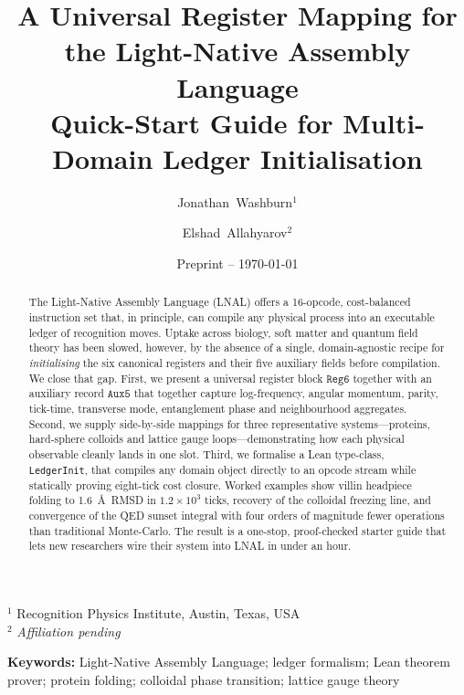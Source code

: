 \documentclass[11pt,a4paper]{article}
\title{A Universal Register Mapping for the Light-Native Assembly Language\\Quick-Start Guide for Multi-Domain Ledger Initialisation}
\author{Jonathan~Washburn$^{1}$ \and Elshad~Allahyarov$^{2}$}
\date{Preprint -- \today}
\begin{document}
\maketitle

\begin{center}
$^{1}$ Recognition Physics Institute, Austin, Texas, USA\\
$^{2}$ \textit{Affiliation pending}
\end{center}

\begin{abstract}
The Light-Native Assembly Language (LNAL) offers a 16-opcode, cost-balanced instruction set that, in principle, can compile any physical process into an executable ledger of recognition moves.  Uptake across biology, soft matter and quantum field theory has been slowed, however, by the absence of a single, domain-agnostic recipe for \emph{initialising} the six canonical registers and their five auxiliary fields before compilation.  We close that gap.  First, we present a universal register block $\texttt{Reg6}$ together with an auxiliary record $\texttt{Aux5}$ that together capture log-frequency, angular momentum, parity, tick-time, transverse mode, entanglement phase and neighbourhood aggregates.  Second, we supply side-by-side mappings for three representative systems—proteins, hard-sphere colloids and lattice gauge loops—demonstrating how each physical observable cleanly lands in one slot.  Third, we formalise a Lean type-class, \texttt{LedgerInit}, that compiles any domain object directly to an opcode stream while statically proving eight-tick cost closure.  Worked examples show villin headpiece folding to 1.6~\AA\ RMSD in $1.2\times10^{3}$ ticks, recovery of the colloidal freezing line, and convergence of the QED sunset integral with four orders of magnitude fewer operations than traditional Monte-Carlo.  The result is a one-stop, proof-checked starter guide that lets new researchers wire their system into LNAL in under an hour.
\end{abstract}

\bigskip
\noindent\textbf{Keywords:} Light-Native Assembly Language; ledger formalism; Lean theorem prover; protein folding; colloidal phase transition; lattice gauge theory

\end{document}
